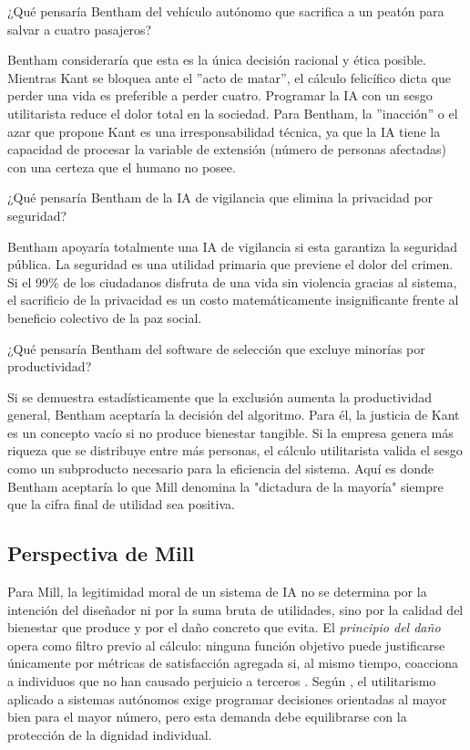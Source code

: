 \medskip

¿Qué pensaría Bentham del vehículo autónomo que sacrifica a un peatón para salvar a cuatro pasajeros?

Bentham consideraría que esta es la única decisión racional y ética posible. Mientras Kant se bloquea ante el ''acto de matar'', el cálculo felicífico dicta que perder una vida es preferible a perder cuatro. Programar la IA con un sesgo utilitarista reduce el dolor total en la sociedad. Para Bentham, la ''inacción'' o el azar que propone Kant es una irresponsabilidad técnica, ya que la IA tiene la capacidad de procesar la variable de extensión (número de personas afectadas) con una certeza que el humano no posee.

\medskip

¿Qué pensaría Bentham de la IA de vigilancia que elimina la privacidad por seguridad?

Bentham apoyaría totalmente una IA de vigilancia si esta garantiza la seguridad pública. La seguridad es una utilidad primaria que previene el dolor del crimen. Si el 99\% de los ciudadanos disfruta de una vida sin violencia gracias al sistema, el sacrificio de la privacidad es un costo matemáticamente insignificante frente al beneficio colectivo de la paz social.

\medskip

¿Qué pensaría Bentham del software de selección que excluye minorías por productividad?

Si se demuestra estadísticamente que la exclusión aumenta la productividad general, Bentham aceptaría la decisión del algoritmo. Para él, la justicia de Kant es un concepto vacío si no produce bienestar tangible. Si la empresa genera más riqueza que se distribuye entre más personas, el cálculo utilitarista valida el sesgo como un subproducto necesario para la eficiencia del sistema. Aquí es donde Bentham aceptaría lo que Mill denomina la "dictadura de la mayoría" siempre que la cifra final de utilidad sea positiva.


\subsection{Perspectiva de Mill}

Para Mill, la legitimidad moral de un sistema de IA no se determina por la intención del diseñador ni por la suma bruta de utilidades, sino por la calidad del bienestar que produce y por el daño concreto que evita. El \textit{principio del daño} opera como filtro previo al cálculo: ninguna función objetivo puede justificarse únicamente por métricas de satisfacción agregada si, al mismo tiempo, coacciona a individuos que no han causado perjuicio a terceros \citep{mill1863utilitarianism}. Según \citet{mishra2025moral}, el utilitarismo aplicado a sistemas autónomos exige programar decisiones orientadas al mayor bien para el mayor número, pero esta demanda debe equilibrarse con la protección de la dignidad individual.

